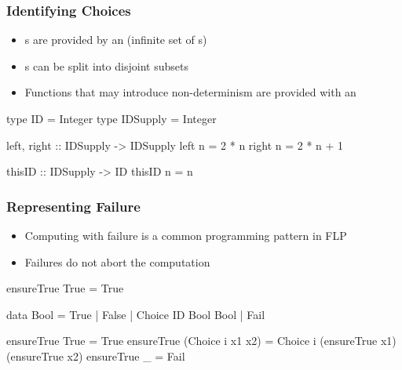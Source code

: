 \documentclass[%
,hyperref={pdfpagelabels=false}
,utf8
]{beamer}
\begin{document}
\begin{frame}[fragile]%
\frametitle{Identifying Choices}
\begin{itemize}
 \item {}s are provided by an 
       (infinite set of s)
 \item {}s can be split into disjoint subsets
 \item Functions that may introduce non-determinism
       are provided with an 
\end{itemize}
\pause

\begin{haskell} 
type ID = Integer
type IDSupply = Integer

left, right :: IDSupply -> IDSupply
left  n = 2 * n
right n = 2 * n + 1

thisID :: IDSupply -> ID
thisID n = n
\end{haskell}
\end{frame}

\begin{frame}[fragile]%
\frametitle{Representing Failure}
\begin{itemize}
 \item Computing with failure is a common programming pattern in FLP
 \item Failures do not abort the computation
\end{itemize}

\begin{curry}
ensureTrue True = True
\end{curry}

\begin{haskell}
data Bool = True | False | Choice ID Bool Bool \alert{| Fail}

ensureTrue True             = True
ensureTrue (Choice i x1 x2) = Choice i (ensureTrue x1)
                                       (ensureTrue x2)
\alert{ensureTrue _                = Fail}
\end{haskell}
\end{frame}
\end{document}
